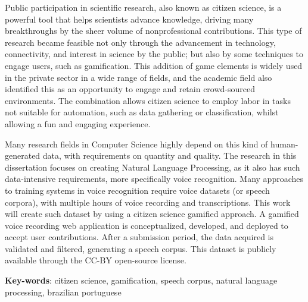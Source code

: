
\setlength{\absparsep}{18pt}
\begin{resumo}
Public participation in scientific research, also known as citizen science, is a powerful tool that helps scientists advance knowledge, driving many breakthroughs by the sheer volume of nonprofessional contributions. This type of research became feasible not only through the advancement in technology, connectivity, and interest in science by the public; but also by some techniques to engage users, such as gamification. This addition of game elements is widely used in the private sector in a wide range of fields, and the academic field also identified this as an opportunity to engage and retain crowd-sourced environments. The combination allows citizen science to employ labor in tasks not suitable for automation, such as data gathering or classification, whilst allowing a fun and engaging experience. 

Many research fields in Computer Science highly depend on this kind of human-generated data, with requirements on quantity and quality. The research in this dissertation focuses on creating Natural Language Processing, as it also has such data-intensive requirements, more specifically voice recognition. Many approaches to training systems in voice recognition require voice datasets (or speech corpora), with multiple hours of voice recording and transcriptions. This work will create such dataset by using a citizen science gamified approach. A gamified voice recording web application is conceptualized, developed, and deployed to accept user contributions. After a submission period, the data acquired is validated and filtered, generating a speech corpus. This dataset is publicly available through the CC-BY open-source license.
	\vspace{\onelineskip}
	\noindent 
	
	\textbf{Key-words}: citizen science, gamification, speech corpus, natural language processing, brazilian portuguese
\end{resumo}
